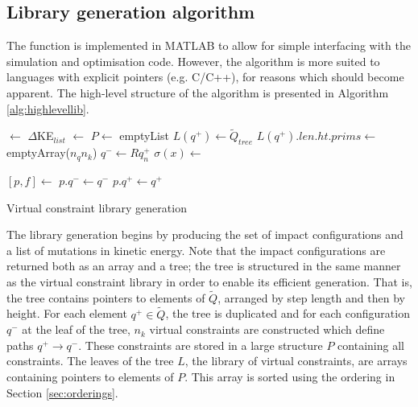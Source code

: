 \subsection{Library generation algorithm}
The  function is implemented in MATLAB to allow for simple interfacing with the simulation and optimisation code. However, the algorithm is more suited to languages with explicit pointers (e.g. C/C++), for reasons which should become apparent. The high-level structure of the algorithm is presented in Algorithm \ref{alg:highlevellib}.

\begin{algorithm}
\begin{algorithmic}[1]
		 $\gets$ 
		\State $\Delta$KE$_{list}$ $\gets$ 
		\State $P \gets$ emptyList
			\State $L(q^+) \gets \tilde{Q}_{tree}$
					\State $L(q^+).len.ht.prims \gets$ emptyArray($n_qn_k$)
						\State $q^- \gets Rq_n^+$
						\State $\sigma(x) \gets$ 
							
							\State $[p, f] \gets$ 
								\State $p.q^- \gets q^-$
								\State $p.q^+ \gets q^+$
								\State \Call{addToList}{$P, p$}
								\State {}
							\EndIf
						\EndFor
					\EndFor
					\State {}
				\EndFor
			\EndFor
		\EndFor
		\State {}
	\EndFunction
\end{algorithmic}
\caption{Virtual constraint library generation}
\label{alg:highlevellib}
\end{algorithm}

The library generation begins by producing the set of impact configurations and a list of mutations in kinetic energy. Note that the impact configurations are returned both as an array and a tree; the tree is structured in the same manner as the virtual constraint library in order to enable its efficient generation. That is, the tree contains pointers to elements of $\tilde{Q}$, arranged by step length and then by height. For each element $q^+ \in \tilde{Q}$, the tree is duplicated and for each configuration $q^-$ at the leaf of the tree, $n_k$ virtual constraints are constructed which define paths $q^+ \to q^-$. These constraints are stored in a large structure $P$ containing all constraints. The leaves of the tree $L$, the library of virtual constraints, are arrays containing pointers to elements of $P$. This array is sorted using the ordering in Section \ref{sec:orderings}. %

